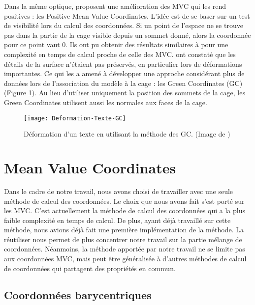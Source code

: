 Dans la même optique, \cite{LKCL07} proposent une amélioration des MVC qui les
rend positives : les Positive Mean Value Coordinates. L'idée est de se baser
sur un test de visibilité lors du calcul des coordonnées. Si un point de
l'espace ne se trouve pas dans la partie de la cage visible depuis un sommet
donné, alors la coordonnée pour ce point vaut 0. Ils ont pu obtenir des
résultats similaires à \cite{JMDGS07} pour une complexité en temps de calcul
proche de celle des MVC. \cite{LLC08} ont constaté que les détails de la
surface n'étaient pas préservés, en particulier lors de déformations
importantes. Ce qui les a amené à développer une approche considérant plus de
données lors de l'association du modèle à la cage : les Green Coordinates (GC)
(Figure \ref{DEFGre}). Au lieu d'utiliser uniquement la position des sommets
de la cage, les Green Coordinates utilisent aussi les normales aux faces de la
cage.

\begin{figure}[ht]
\begin{center}
\texttt{[image: Deformation-Texte-GC]}

\caption[Déformation d'un texte (GC)] {Déformation d'un texte en utilisant la
méthode des GC. (Image de \cite{LLC08})}

\label{DEFGre}
\end{center}
\end{figure}

\section{Mean Value Coordinates}

Dans le cadre de notre travail, nous avons choisi de travailler avec une seule
méthode de calcul des coordonnées. Le choix que nous avons fait s'est porté
sur les MVC. C'est actuellement la méthode de calcul des coordonnées qui a la
plus faible complexité en temps de calcul. De plus, ayant déjà travaillé sur
cette méthode, nous avions déjà fait une première implémentation de la
méthode. La réutiliser nous permet de plus concentrer notre travail sur la
partie mélange de coordonnées. Néanmoins, la méthode apportée par notre
travail ne se limite pas aux coordonnées MVC, mais peut être généralisée à
d'autres méthodes de calcul de coordonnées qui partagent des propriétés en
commun.

\subsection{Coordonnées barycentriques}

